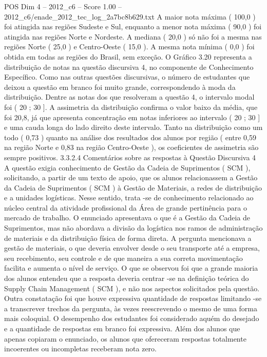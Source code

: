 \begin{textsample}{POS Dim 4 – 2012\_c6 – Score 1.00 – 2012\_c6/enade\_2012\_tec\_log\_2a7bc8b629.txt}
A maior nota máxima ( 100,0 ) foi atingida nas regiões Sudeste e Sul, enquanto a menor nota máxima ( 90,0 ) foi atingida nas regiões Norte e Nordeste.
A mediana ( 20,0 ) só não foi a mesma nas regiões Norte ( 25,0 ) e Centro-Oeste ( 15,0 ).
A mesma nota mínima ( 0,0 ) foi obtida em todas as regiões do Brasil, sem exceção.
O Gráfico 3.20 representa a distribuição de notas na questão discursiva 4, no componente de Conhecimento Específico.
Como nas outras questões discursivas, o número de estudantes que deixou a questão em branco foi muito grande, correspondendo à moda da distribuição.
Dentre as notas dos que resolveram a questão 4, o intervalo modal foi ( 20 ; 30 ].
A assimetria da distribuição confirma o valor baixo da média, que foi 20,8, já que apresenta concentração em notas inferiores ao intervalo ( 20 ; 30 ] e uma cauda longa do lado direito deste intervalo.
Tanto na distribuição como um todo ( 0,73 ) quanto na análise dos resultados dos alunos por região ( entre 0,59 na região Norte e 0,83 na região Centro-Oeste ), os coeficientes de assimetria são sempre positivos. 3.3.2.4 Comentários sobre as respostas à Questão Discursiva 4 A questão exigia conhecimento de Gestão da Cadeia de Suprimentos ( SCM ), solicitando, a partir de um texto de apoio, que os alunos relacionassem a Gestão da Cadeia de Suprimentos ( SCM ) à Gestão de Materiais, a redes de distribuição e a unidades logísticas.
Nesse sentido, trata -se de conhecimento relacionado ao núcleo central da atividade profissional da Área de grande pertinência para o mercado de trabalho.
O enunciado apresentava o que é a Gestão da Cadeia de Suprimentos, mas não abordava a divisão da logística nos ramos de administração de materiais e da distribuição física de forma direta.
A pergunta mencionava a gestão de materiais, o que deveria envolver desde o seu transporte até a empresa, seu recebimento, seu controle e de que maneira a sua correta movimentação facilita e aumenta o nível de serviço.
O que se observou foi que a grande maioria dos alunos entendeu que a resposta deveria centrar -se na definição teórica do Supply Chain Management ( SCM ), e não nos aspectos solicitados pela questão.
Outra constatação foi que houve expressiva quantidade de respostas limitando -se a transcrever trechos da pergunta, às vezes reescrevendo o mesmo de uma forma mais coloquial.
O desempenho dos estudantes foi considerado aquém do desejado e a quantidade de respostas em branco foi expressiva.
Além dos alunos que apenas copiaram o enunciado, os alunos que ofereceram respostas totalmente incoerentes ou incompletas receberam nota zero.

\end{textsample}
